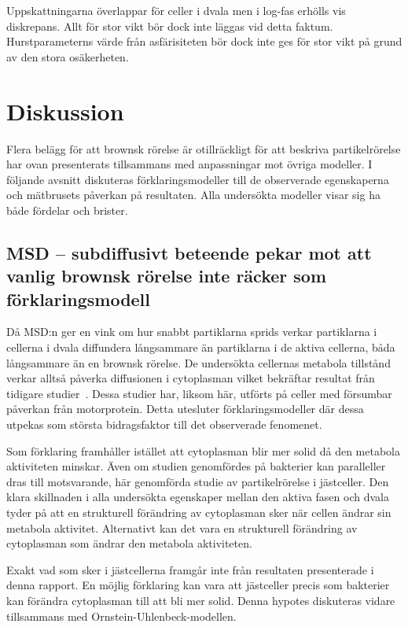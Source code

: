 Uppskattningarna överlappar för celler i dvala men i log-fas erhölls vis diskrepans. Allt för stor vikt bör dock inte läggas vid detta faktum. Hurstparameterns värde från asfärisiteten bör dock inte ges för stor vikt på grund av den stora osäkerheten.  


\section{Diskussion}

Flera belägg för att brownsk rörelse är otillräckligt för att beskriva partikelrörelse har ovan presenterats tillsammans med anpassningar mot övriga modeller. I följande avsnitt diskuteras förklaringsmodeller till de observerade egenskaperna och mätbrusets påverkan på resultaten. Alla undersökta modeller visar sig ha både fördelar och brister.

\subsection{MSD -- subdiffusivt beteende pekar mot att vanlig brownsk rörelse inte räcker som förklaringsmodell}

Då MSD:n ger en vink om hur snabbt partiklarna sprids verkar partiklarna i cellerna i dvala diffundera långsammare än partiklarna i de aktiva cellerna, båda långsammare än en brownsk rörelse. De undersökta cellernas metabola tillstånd verkar alltså påverka diffusionen i cytoplasman vilket bekräftar resultat från tidigare studier~\cite{Gou_etal2014,Parry_etal2014,Midtveldt_etal2016}. Dessa studier har, liksom här, utförts på celler med försumbar påverkan från motorprotein. Detta utesluter förklaringsmodeller där dessa utpekas som största bidragsfaktor till det observerade fenomenet. 

Som förklaring framhåller \cite{Parry_etal2014} istället att cytoplasman blir mer solid då den metabola aktiviteten minskar. Även om studien genomfördes på bakterier kan paralleller dras till motsvarande, här genomförda studie av partikelrörelse i jästceller. Den klara skillnaden i alla undersökta egenskaper mellan den aktiva fasen och dvala tyder på att en strukturell förändring av cytoplasman sker när cellen ändrar sin metabola aktivitet. Alternativt kan det vara en strukturell förändring av cytoplasman som ändrar den metabola aktiviteten. 

Exakt vad som sker i jästcellerna framgår inte från resultaten presenterade i denna rapport. En möjlig förklaring kan vara att jästceller precis som bakterier kan förändra cytoplasman till att bli mer solid\cite{Midtveldt_etal2016}. Denna hypotes diskuteras vidare tillsammans med Ornstein-Uhlenbeck-modellen. 


